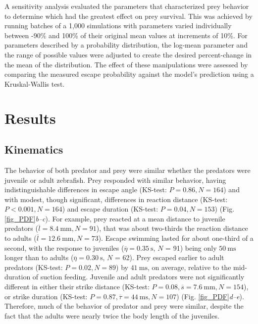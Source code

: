 \documentclass[]{rsos}%
\begin{document}
A sensitivity analysis evaluated the parameters that characterized prey behavior to determine which had the greatest effect on prey survival. 
This was achieved by running batches of a 1,000 simulations with parameters varied individually between -90\% and 100\% of their original mean values at increments of 10\%.
For parameters described by a probability distribution, the log-mean parameter and the range of possible values were adjusted to create the desired percent-change in the mean of the distribution.
The effect of these manipulations were assessed by comparing the measured escape probability against the model's prediction using a Kruskal-Wallis test. 



\section{Results} %

\subsection{Kinematics} %
The behavior of both predator and prey were similar whether the predators were juvenile or adult zebrafish.
Prey responded with similar behavior, having indistinguishable differences in escape angle (KS-test: $P = 0.86, N = 164$) and with modest, though significant, differences in reaction distance (KS-test: $P < 0.001, N = 164$) and escape duration (KS-test: $P = 0.04, N = 153$) (Fig. \ref{fig_PDF}\textit{b--c}). 
For example, prey reacted at a mean distance to juvenile predators ($\overline{l} = \SI{8.4}{\mm}, N = 91$), that was about two-thirds the reaction distance to adults ($\overline{l} = \SI{12.6}{\mm}, N = 73$).
Escape swimming lasted for about one-third of a second, with the response to juveniles ($\overline{\eta} = \SI{0.35}{\s}$, $N$ = 91) being only  $\SI{50}{\ms}$ longer than to adults ($\overline{\eta} = \SI{0.30}{\s}$, $N$ = 62).
Prey escaped earlier to adult predators (KS-test: $P = 0.02, N = 89$) by $\SI{41}{\ms}$, on average, relative to the mid-duration of suction feeding.
Juvenile and adult predators were not significantly different in either their strike distance (KS-test: $P = 0.08, \overline{s} = \SI{7.6}{\mm}, N = 154$), or strike duration (KS-test: $P = 0.87, \overline{\tau} = \SI{44}{\ms}, N = 107$) (Fig. \ref{fig_PDF}\textit{d--e}).
Therefore, much of the behavior of predator and prey were similar, despite the fact that the adults were nearly twice the body length of the juveniles.
\end{document}

